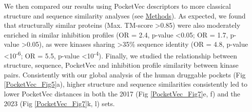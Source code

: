 We then compared our results using PocketVec descriptors to more classical structure and sequence similarity analyses (see \hyperref[PocketVec_Methods]{Methods}). As expected, we found that structurally similar proteins (Max. TM-score >0.85) were also moderately enriched in similar inhibition profiles (OR = 2.4, p-value <0.05; OR = 1.7, p-value >0.05), as were kinases sharing >35\% sequence identity (OR = 4.8, p-value <10\textsuperscript{-6}; OR = 5.5, p-value <10\textsuperscript{-4}). Finally, we studied the relationship between structure, sequence, PocketVec and inhibition profile similarity between kinase pairs. Consistently with our global analysis of the human druggable pockets (Fig \ref{PocketVec_Fig5}a), higher structure and sequence similarities consistently led to lower PocketVec distances in both the 2017 (Fig \ref{PocketVec_Fig7}e, f) and the 2023 (Fig \ref{PocketVec_Fig7}k, l) sets.


